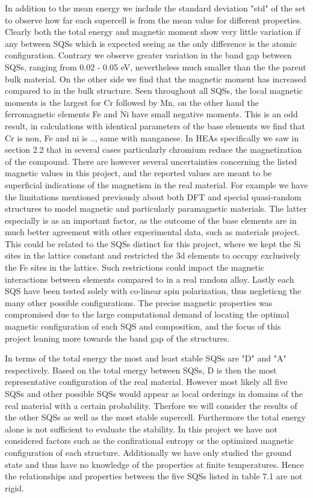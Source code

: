 In addition to the mean energy we include the standard deviation "std" of the set to observe how far each supercell is from the mean value for different properties. Clearly both the total energy and magnetic moment show very little variation if any between SQSs which is expected seeing as the only difference is the atomic configuration. Contrary we observe greater variation in the band gap between SQSs, ranging from 0.02 - 0.05 eV, nevertheless much smaller than the the parent bulk material. On the other side we find that the magnetic moment has increased compared to in the bulk structure. Seen throughout all SQSs, the local magnetic moments is the largest for Cr followed by Mn, on the other hand the ferromagnetic elements Fe and Ni have small negative moments. This is an odd result, in calculations with identical parameters of the base elements we find that Cr is non, Fe and ni is .., same with manganese. In HEAs specifically we saw in section 2.2 that in several cases particularly chromium reduce the magnetization of the compound. There are however several uncertainties concerning the listed magnetic values in this project, and the reported values are meant to be superficial indications of the magnetism in the real material. For example we have the limitations mentioned previously about both DFT and special quasi-random structures to model magnetic and particularly paramagnetic materials. The latter especially is as an important factor, as the outcome of the base elements are in much better agreement with other experimental data, such as materials project. This could be related to the SQSs distinct for this project, where we kept the Si sites in the lattice constant and restricted the 3d elements to occupy exclusively the Fe sites in the lattice. Such restrictions could impact the magnetic interactions between elements compared to in a real random alloy.  Lastly each SQS have been tested solely with co-linear spin polarization, thus negleticng the many other possible configurations. The precise magnetic properties was compromised due to the large computational demand of locating the optimal magnetic configuration of each SQS and composition, and the focus of this project leaning more towards the band gap of the structures.   

  
In terms of the total energy the most and least stable SQSs are "D" and "A" respectively. Based on the total energy between SQSs, D is then the most representative configuration of the real material. However most likely all five SQSs and other possible SQSs would appear as local orderings in domains of the real material with a certain probability. Therfore we will consider the results of the other SQSs as well as the most stable supercell. Furthermore the total energy alone is not sufficient to evaluate the stability. In this project we have not considered factors such as the confirational entropy or the optimized magnetic configuration of each structure. Additionally we have only studied the ground state and thus have no knowledge of the properties at finite temperatures. Hence the relationships and properties between the five SQSs listed in table 7.1 are not rigid.     

